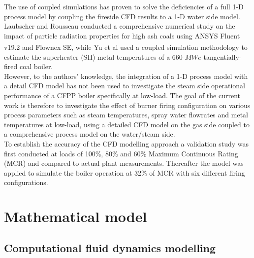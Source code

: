 \documentclass[review]{elsarticle}
\begin{document}
The use of coupled simulations has proven to solve the deficiencies of a full 1-D process model by coupling the fireside CFD results to a 1-D water side model. Laubscher and Rousseau \cite{Laubscher2020} conducted a comprehensive numerical study on the impact of particle radiation properties for high ash coals using ANSYS Fluent v19.2\textsuperscript{\textregistered} and Flownex SE\textsuperscript{\textregistered}, while Yu et al \cite{Yu2019} used a coupled simulation methodology to estimate the superheater (SH) metal temperatures of a 660 $MWe$ tangentially-fired coal boiler.\\

However, to the authors’ knowledge, the integration of a 1-D process model with a detail CFD model has not been used to investigate the steam side operational performance of a CFPP boiler specifically at low-load. The goal of the current work is therefore to investigate the effect of burner firing configuration on various process parameters such as steam temperatures, spray water flowrates and metal temperatures at low-load, using a detailed CFD model on the gas side coupled to a comprehensive process model on the water/steam side.\\

To establish the accuracy of the CFD modelling approach a validation study was first conducted at loads of 100\%, 80\% and 60\% Maximum Continuous Rating (MCR) and compared to actual plant measurements. Thereafter the model was applied to simulate the boiler operation at 32\% of MCR with six different firing configurations.

\section{Mathematical model}
\subsection{Computational fluid dynamics modelling}
\end{document}
